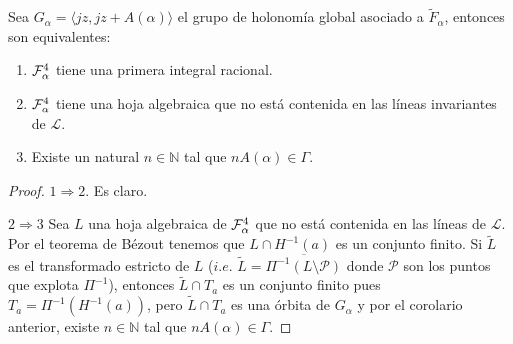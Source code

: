 \begin{Proposicion}
\label{Prop:EquivalenciasIntegrabilidad}
Sea $G_{\alpha}=\langle jz,jz+A(\alpha)\rangle$ el grupo de holonomía global asociado a $\tilde{F}_{\alpha}$, entonces son equivalentes:
\begin{enumerate}
\item $\mathcal{F}_{\alpha}^{4}$ tiene una primera integral racional.
\item $\mathcal{F}_{\alpha}^{4}$ tiene una hoja algebraica que no está contenida en las líneas invariantes de $\mathcal{L}$.
\item Existe un natural $n\in\mathbb{N}$ tal que $nA(\alpha)\in\Gamma$.
\end{enumerate}
\end{Proposicion} 
\begin{proof}
$1\Rightarrow 2$. Es claro.

\noindent $2\Rightarrow 3$ Sea $L$ una hoja algebraica de $\mathcal{F}_{\alpha}^{4}$ que no está contenida en las líneas de $\mathcal{L}$. Por el teorema de Bézout tenemos que $L\cap H^{-1}(a)$ es un conjunto finito. Si $\tilde{L}$ es el transformado estricto de $L$ ($\mathit{i.e.}$ $\tilde{L}=\overline{\Pi^{-1}(L\setminus\mathcal{P})}$ donde $\mathcal{P}$ son los puntos que explota $\Pi^{-1}$), entonces $\tilde{L}\cap T_{a}$ es un conjunto finito pues $T_{a}=\Pi^{-1}(H^{-1}(a))$, pero $\tilde{L}\cap T_{a}$ es una órbita de $G_{\alpha}$ y por el corolario anterior, existe $n\in\mathbb{N}$ tal que $nA(\alpha)\in\Gamma$.


\end{proof}
